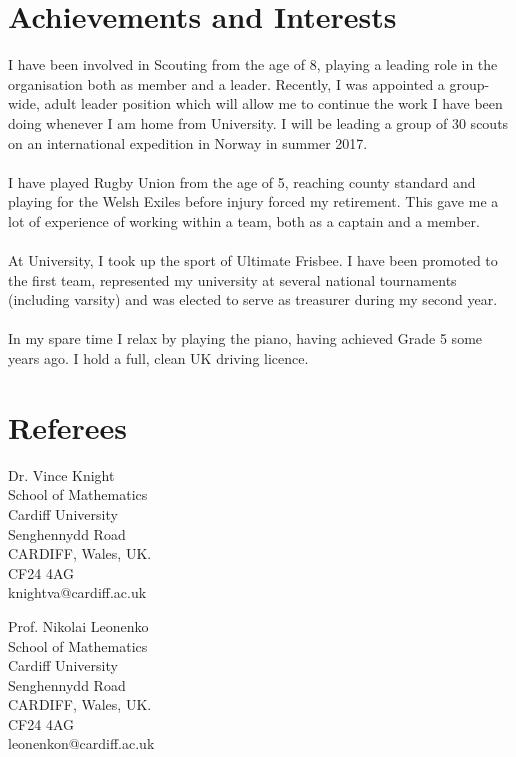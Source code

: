 \documentclass[a4paper]{article}
\begin{document}
\section{Achievements and Interests}
I have been involved in Scouting from the age of 8, playing a leading role in the organisation both as member and a leader.
Recently, I was appointed a group-wide, adult leader position which will allow me to continue the work I have been doing whenever I am home from University.
I will be leading a group of 30 scouts on an international expedition in Norway in summer 2017.\\
\\
I have played Rugby Union from the age of 5, reaching county standard and playing for the Welsh Exiles before injury forced my retirement.
This gave me a lot of experience of working within a team, both as a captain and a member. \\
\\
At University, I took up the sport of Ultimate Frisbee. I have been promoted to the first team, represented my university at several national tournaments (including varsity) and was elected to serve as treasurer during my second year. \\
\\
In my spare time I relax by playing the piano, having achieved Grade 5 some years ago. I hold a full, clean UK driving licence.
\section{Referees}

\begin{minipage}[b]{0.5\linewidth}
Dr. Vince Knight\\
School of Mathematics\\
Cardiff University\\
Senghennydd Road\\
CARDIFF, Wales, UK.\\
CF24 4AG\\
knightva@cardiff.ac.uk
\end{minipage}
%
%
\begin{minipage}[b]{0.5\linewidth}
Prof. Nikolai Leonenko\\
School of Mathematics\\
Cardiff University\\
Senghennydd Road\\
CARDIFF, Wales, UK.\\
CF24 4AG\\
leonenkon@cardiff.ac.uk
\end{minipage}
\end{document}
